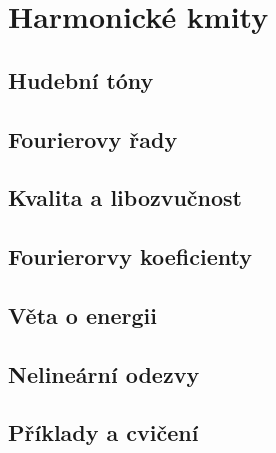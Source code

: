 \chapter{Harmonické kmity}\label{fyz:IchapL}
\minitoc
  \section{Hudební tóny}\label{fyz:IchapLsecI}
  \section{Fourierovy řady}\label{fyz:IchapLsecII}
  \section{Kvalita a libozvučnost}\label{fyz:IchapLsecIII}
  \section{Fourierorvy koeficienty}\label{fyz:IchapLsecIV}
  \section{Věta o energii}\label{fyz:IchapLsecV}
  \section{Nelineární odezvy}\label{fyz:IchapLsecVI}
  \section{Příklady a cvičení}\label{fyz:IchapLsecVII}